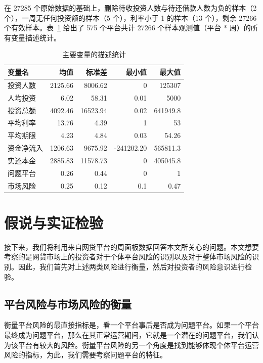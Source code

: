 \documentclass[lang=cn,11pt]{elegantpaper}
\begin{document}
在 27285 个原始数据的基础上，删除待收投资人数与待还借款人数为负的样本（2 个），一周无任何投资额的样本（5 个），利率小于 1 的样本（13 个），剩余 27266 个有效样本。表~\ref{tab:sum} 给出了 575 个平台共计 27266 个样本观测值（平台 * 周）的所有变量描述统计。

\begin{table}[htbp]
\centering
\caption{主要变量的描述统计\label{tab:sum}}
\begin{tabular}{lrrrr}
\toprule
变量名   & 均值    & 标准差   & 最小值   & 最大值 \\
\midrule
投资人数  & 2125.66 & 8006.62 & 0     & 125307 \\
人均投资  & 6.02  & 58.31 & 0.01  & 5000 \\
投资总额  & 4092.46 & 16523.94 & 0.02  & 641949.8 \\
平均利率  & 13.76 & 4.39  & 1     & 53 \\
平均期限  & 4.23  & 4.84  & 0.03  & 54.26 \\
资金净流入 & 1206.63 & 9675.92 & -241202.20 & 565811.3 \\
实还本金  & 2885.83 & 11578.73 & 0     & 405045.8 \\
问题平台  & 0.26  & 0.44  & 0     & 1 \\
市场风险  & 0.25  & 0.12  & 0.1   & 0.47 \\
\bottomrule
\end{tabular}%
\end{table}%
    

\section{假说与实证检验}

接下来，我们将利用来自网贷平台的周面板数据回答本文所关心的问题。本文想要考察的是网贷市场上的投资者对于个体平台风险的识别以及对于整体市场风险的识别。因此，我们首先对上述两类风险进行衡量，然后对投资者的风险意识进行检验。

\subsection{平台风险与市场风险的衡量}

衡量平台风险的最直接指标是，看一个平台事后是否成为问题平台。如果一个平台最终成为问题平台，那么在其正常运营期间，它就是一个潜在的问题平台，我们认为该平台有较大的风险。衡量平台风险的另一个角度是找到能够体现个体平台运营风险的指标，为此，我们需要考察问题平台的特征。
\end{document}
